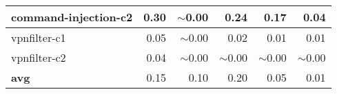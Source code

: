 \begin{table}[!tb]
{\begin{tabular}{|l|r|r|r|r|r|}
            command-injection-c2                & 0.30                                   & $\sim$0.00                                 & 0.24                                   & 0.17                                             & 0.04                                  \\ \hline
            vpnfilter-c1                        & 0.05                                   & $\sim$0.00                                 & 0.02                                   & 0.01                                             & 0.01                                  \\ \hline
            vpnfilter-c2                        & 0.04                                   & $\sim$0.00                                 & $\sim$0.00                                   & $\sim$0.00                                             & $\sim$0.00                                  \\ \hline
            \textbf{avg}                                 & 0.15                                   & 0.10                                 & 0.20                                   & 0.05                                             & 0.01                                  \\ \hline
            \end{tabular}
        \label{tab:attackLowRP}
        }
\end{table}